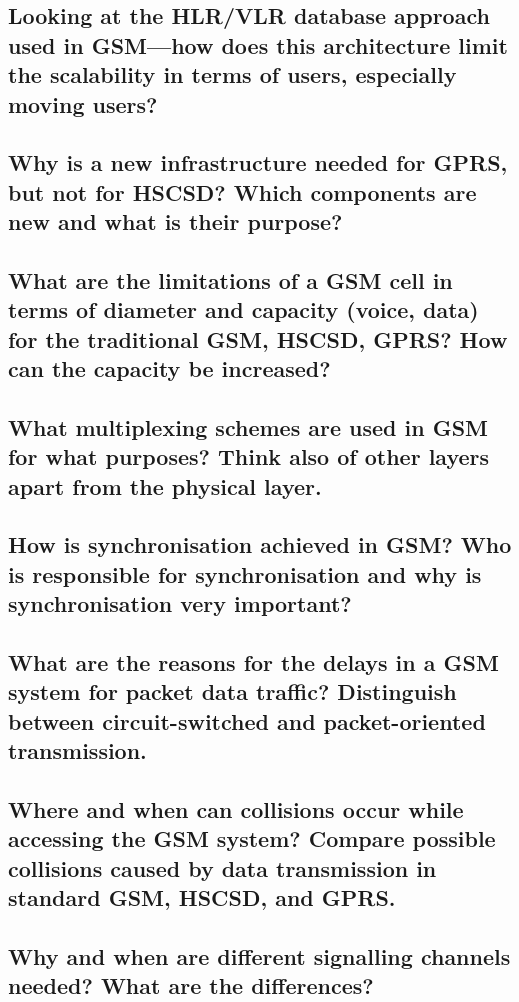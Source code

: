 \subsection{Looking at the HLR/VLR database approach used in GSM—how does this
architecture limit the scalability in terms of users, especially moving users?}

\subsection{Why is a new infrastructure needed for GPRS, but not for HSCSD? Which
components are new and what is their purpose?}

\subsection{What are the limitations of a GSM cell in terms of diameter and capacity (voice, data)
for the traditional GSM, HSCSD, GPRS? How can the capacity be increased?}

\subsection{What multiplexing schemes are used in GSM for what purposes? Think also of other
layers apart from the physical layer.}

\subsection{How is synchronisation achieved in GSM? Who is responsible for synchronisation
and why is synchronisation very important?}

\subsection{What are the reasons for the delays in a GSM system for packet data traffic?
Distinguish between circuit-switched and packet-oriented transmission.}

\subsection{Where and when can collisions occur while accessing the GSM system? Compare
possible collisions caused by data transmission in standard GSM, HSCSD, and
GPRS.}

\subsection{Why and when are different signalling channels needed? What are the differences?}

